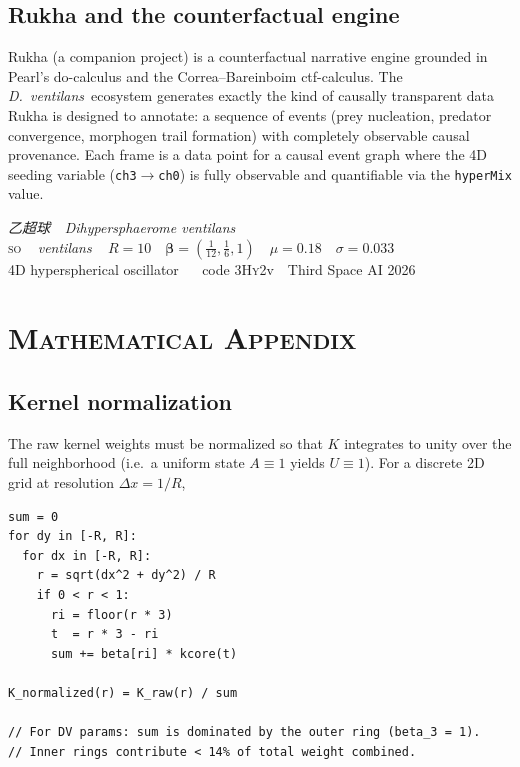 \documentclass[11pt,a4paper]{article}
\newcommand{\spc}[1]{\textit{#1}}  %
\newcommand{\ventilans}{\textit{ventilans}}
\newcommand{\DV}{\spc{D.\ ventilans}}
\newcommand{\SO}{\textsc{so}}
\begin{document}
\subsection{Rukha and the counterfactual engine}
Rukha (a companion project) is a counterfactual narrative engine grounded
in Pearl's do-calculus and the Correa--Bareinboim ctf-calculus. The \DV\
ecosystem generates exactly the kind of causally transparent data Rukha
is designed to annotate: a sequence of events (prey nucleation, predator
convergence, morphogen trail formation) with completely observable causal
provenance. Each frame is a data point for a causal event graph where the
4D seeding variable (\texttt{ch3}$\to$\texttt{ch0}) is fully observable
and quantifiable via the \texttt{hyperMix} value.

\vspace{22pt}
\begin{center}
{\Large\itshape\color{accent}乙超球 \,\textperiodcentered\, \textit{Dihypersphaerome ventilans}}\\[3pt]
{\sffamily\footnotesize\color{muted}
  \SO\ \,\textperiodcentered\, \ventilans\ \,\textperiodcentered\, $R{=}10$ \,\textperiodcentered\,
  $\boldsymbol{\beta}{=}(\tfrac{1}{12},\tfrac{1}{6},1)$ \,\textperiodcentered\, $\mu{=}0.18$ \,\textperiodcentered\, $\sigma{=}0.033$\\
  4D hyperspherical oscillator \,\textperiodcentered\, \citealt{chan2020} \,\textperiodcentered\,
  code 3\textsc{Hy}2v \,\textperiodcentered\, Third Space AI 2026}
\end{center}

\appendix
\section*{\hfil\normalsize\scshape Mathematical Appendix \hfil}
\renewcommand{\thesubsection}{\Alph{subsection}}
\setcounter{subsection}{0}

\subsection{Kernel normalization}
The raw kernel weights must be normalized so that $K$ integrates to unity
over the full neighborhood (i.e.\ a uniform state $A\equiv 1$ yields
$U\equiv 1$). For a discrete 2D grid at resolution $\Delta x = 1/R$,

\begin{lstlisting}[language=pseudo, caption={Kernel normalization.}]
sum = 0
for dy in [-R, R]:
  for dx in [-R, R]:
    r = sqrt(dx^2 + dy^2) / R
    if 0 < r < 1:
      ri = floor(r * 3)
      t  = r * 3 - ri
      sum += beta[ri] * kcore(t)

K_normalized(r) = K_raw(r) / sum

// For DV params: sum is dominated by the outer ring (beta_3 = 1).
// Inner rings contribute < 14% of total weight combined.
\end{lstlisting}
\end{document}
